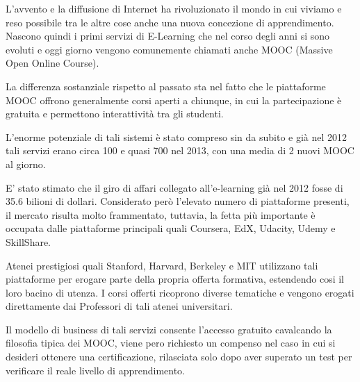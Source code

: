 L'avvento e la diffusione di Internet ha rivoluzionato il mondo in cui viviamo e reso possibile tra le altre cose anche una nuova concezione di apprendimento. Nascono quindi i primi servizi di E-Learning che nel corso degli anni si sono evoluti e oggi giorno vengono comunemente chiamati anche MOOC (Massive Open Online Course).

La differenza sostanziale rispetto al passato sta nel fatto che le piattaforme MOOC offrono generalmente corsi aperti a chiunque, in cui la partecipazione è gratuita e permettono interattività tra gli studenti.

L'enorme potenziale di tali sistemi è stato compreso sin da subito e già nel 2012 tali servizi erano circa 100 e quasi 700 nel 2013, con una media di 2 nuovi MOOC al giorno.


E' stato stimato che il giro di affari collegato all'e-learning già nel 2012 fosse di 35.6 bilioni di dollari\cite{gallico2015learning}. Considerato però l'elevato numero di piattaforme presenti, il mercato risulta molto frammentato, tuttavia, la fetta più importante è occupata dalle piattaforme principali quali Coursera, EdX, Udacity, Udemy e SkillShare.




Atenei prestigiosi quali Stanford, Harvard, Berkeley e MIT utilizzano tali piattaforme per erogare parte della propria offerta formativa, estendendo cosi il loro bacino di utenza.
I corsi offerti ricoprono diverse tematiche e vengono erogati direttamente dai Professori di tali atenei universitari.

Il modello di business di tali servizi consente l'accesso gratuito cavalcando la filosofia tipica dei MOOC, viene pero richiesto un compenso nel caso in cui si desideri ottenere una certificazione, rilasciata solo dopo aver superato un test per verificare il reale livello di apprendimento.

